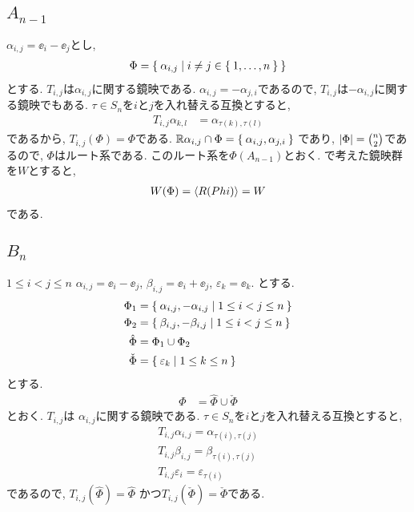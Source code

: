 \subsection{$A_{n-1}$}
\label{ex:an:root}
$\alpha_{i,j}=\ee_i-\ee_j$とし,
\begin{align*}
  \Phi=\Set{\alpha_{i,j}|i\neq j \in \Set{1,\ldots,n}}
\end{align*}
とする.
$T_{i,j}$は$\alpha_{i,j}$に関する鏡映である.
$\alpha_{i,j}=-\alpha_{j,i}$であるので,
$T_{i,j}$は$-\alpha_{i,j}$に関する鏡映でもある.
$\tau\in S_n$を$i$と$j$を入れ替える互換とすると,
\begin{align*}
  T_{i,j}\alpha_{k,l}&=\alpha_{\tau(k),\tau(l)}
\end{align*}
であるから, $T_{i,j}(\Phi)=\Phi$である.
$\mathbb{R}\alpha_{i,j}\cap \Phi=\Set{\alpha_{i,j},\alpha_{j,i}}$
であり,
$\left|\Phi\right|=\binom{n}{2}$であるので,
$\Phi$はルート系である.
このルート系を$\Phi(A_{n-1})$とおく.
で考えた鏡映群を$W$とすると,
\begin{align*}
  W(\Phi)=\Braket{R(Phi)}=W
\end{align*}
である.

\subsection{$B_{n}$}
\label{ex:bn:root}
$1\leq i<j\leq n$
$\alpha_{i,j}=\ee_i-\ee_j$,
$\beta_{i,j}=\ee_i+\ee_j$,
$\varepsilon_{k}=\ee_k$.
とする.
\begin{align*}
  \Phi_1&=\Set{\alpha_{i,j},-\alpha_{i,j}|1\leq i<j\leq n}\\
  \Phi_2&=\Set{\beta_{i,j},-\beta_{i,j}|1\leq i<j\leq n}\\
  \hat\Phi&=\Phi_1\cup \Phi_2\\
  \check\Phi&=\Set{\varepsilon_k|1\leq k\leq n}
\end{align*}
とする.
\begin{align*}
  \Phi&=\hat\Phi\cup \check\Phi
\end{align*}
とおく.
$T_{i,j}$は
$\alpha_{i,j}$に関する鏡映である.
$\tau\in S_n$を$i$と$j$を入れ替える互換とすると,
\begin{align*}
  T_{i,j}\alpha_{i,j}=\alpha_{\tau(i),\tau(j)}\\
  T_{i,j}\beta_{i,j}=\beta_{\tau(i),\tau(j)}\\
  T_{i,j}\varepsilon_{i}=\varepsilon_{\tau(i)}
\end{align*}
であるので,
$T_{i,j}(\hat\Phi)=\hat\Phi$
かつ$T_{i,j}(\check\Phi)=\check\Phi$である.

